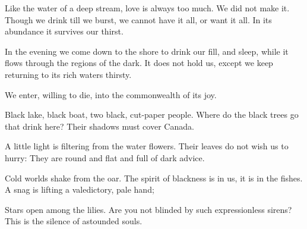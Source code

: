\documentclass[12pt, letterpaper]{report}
\begin{document}
\begin{poem}
\begin{stanza}
Like the water\verseline
of a deep stream,\verseline
love is always too much.\verseline
We did not make it.\verseline
Though we drink till we burst,\verseline
we cannot have it all,\verseline
or want it all.\verseline
In its abundance\verseline
it survives our thirst.
\end{stanza}
\begin{stanza}
In the evening we come down to the shore\verseline
to drink our fill,\verseline
and sleep,\verseline
while it flows\verseline
through the regions of the dark.\verseline
It does not hold us,\verseline
except we keep returning to its rich waters\verseline
thirsty.
\end{stanza}
\begin{stanza}
We enter,\verseline
willing to die,\verseline
into the commonwealth of its joy.
\end{stanza}
\end{poem}

\author{Sylvia Plath}

\begin{poem}
\begin{stanza}
Black lake, black boat, two black, cut-paper people.\verseline
Where do the black trees go that drink here?\verseline
Their shadows must cover Canada.
\end{stanza}
\begin{stanza}
A little light is filtering from the water flowers.\verseline
Their leaves do not wish us to hurry:\verseline
They are round and flat and full of dark advice.
\end{stanza}
\begin{stanza}
Cold worlds shake from the oar.\verseline
The spirit of blackness is in us, it is in the fishes.\verseline
A snag is lifting a valedictory, pale hand;
\end{stanza}
\begin{stanza}
Stars open among the lilies.\verseline
Are you not blinded by such expressionless sirens?\verseline
This is the silence of astounded souls.
\end{stanza}
\end{poem}












  
  
\end{document}
